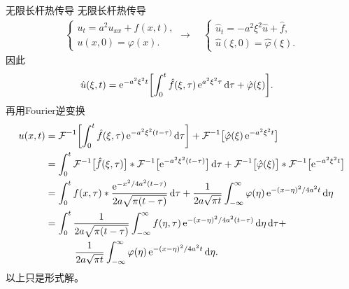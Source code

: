 \begin{example}{无限长杆热传导}{}
	无限长杆热传导
	\begin{align*}
		\begin{cases}
			u_t = a^2u_{xx} + f(x,t),\\
			u(x,0) = \varphi(x).
		\end{cases} \longrightarrow \quad\begin{cases}
			\hat u_t = -a^2\xi^2\hat u + \hat f,\\
			\hat u(\xi,0) = \hat\varphi(\xi).
		\end{cases}
	\end{align*}
	因此
	\begin{align*}
		\hat u(\xi,t) &= \mathop{}\!\mathrm{e}^{-a^2\xi^2t}\biggl[\int_0^t\hat f(\xi,\tau)\mathop{}\!\mathrm{e}^{a^2\xi^2\tau}\mathop{}\!\mathrm{d}\tau + \hat\varphi(\xi)\biggr].
	\end{align*}
	再用Fourier逆变换
	\begin{align}
		u(x,t) &= \FT\inv\biggb{\int_0^t\hat f(\xi,\tau)\e^{-a^2\xi^2(t-\tau)}\d\tau} + \FT\inv\bigb{\hat\varphi(\xi)\e^{-a^2\xi^2t}}\notag\\
		&= \int_0^t\FT\inv\bigb{\hat f(\xi,\tau)} \ast \FT\inv\bigb{\e^{-a^2\xi^2(t-\tau)}}\d\tau + \FT\inv\bigb{\hat\varphi(\xi)} \ast \FT\inv\bigb{\e^{-a^2\xi^2t}}\notag\\
		&= \int_0^tf(x,\tau) \ast \frac{\e^{-x^2/4a^2(t-\tau)}}{2a\sqrt{\pi(t - \tau)}}\d\tau + \frac1{2a\sqrt{\pi t}}\intR\varphi(\eta)\e^{-(x-\eta)^2/4a^2t}\d\eta\notag\\
		&= \int_0^t\frac1{2a\sqrt{\pi(t - \tau)}}\intR f(\eta,\tau)\e^{-(x-\eta)^2/4a^2(t-\tau)}\d\eta\d\tau +\notag\\
		&\qqquad\frac1{2a\sqrt{\pi t}}\intR\varphi(\eta)\e^{-(x-\eta)^2/4a^2t}\d\eta.\label{eq:mmp-forced-heat-kernel-solution}
	\end{align}
	以上只是形式解。
\end{example}
